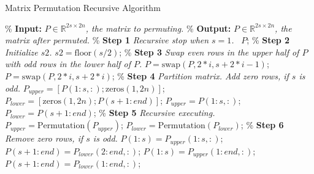 \documentclass[12pt]{article}
\begin{document}
\begin{algorithm}[htbp]
    \caption{Matrix Permutation Recursive Algorithm} \label{alg:Permutation}
    \begin{algorithmic}[1]
        \State \% \textbf{Input:} \textit{$P \in \mathbb{R}^{2s \times 2n}$, the matrix to permuting.}
        \State \% \textbf{Output:} \textit{$P \in \mathbb{R}^{2s \times 2n}$, the matrix after permuted.}
        \State
        \State \% \textbf{Step 1} \textit{Recursive stop when $s=1$.}
            \State \Return \ $P$;
        \End 
        \State
        \State \% \textbf{Step 2} \textit{Initialize $s2$.}
        \State $s2 = \text{floor}(s/2)$;
        \State
        \State \% \textbf{Step 3} \textit{Swap even rows in the upper half of $P$ with odd rows in the lower half of $P$.}
                \State $P= \text{swap}(P,2*i,s+2*i-1)$;
            \Else
                \State $P= \text{swap}(P,2*i,s+2*i)$;
            \End
        \End
        \State
        \State \% \textbf{Step 4} \textit{Partition matrix. Add zero rows, if $s$ is odd.}
            \State $P_{upper} = [P(1:s,:); \text{zeros}(1, 2n)]$;
            \State $P_{lower} = [\text{zeros}(1, 2n); P(s+1:end)]$;
        \Else
            \State $P_{upper} = P(1:s,:)$;
            \State $P_{lower} = P(s+1:end)$;
        \End
        \State
        \State \% \textbf{Step 5} \textit{Recursive executing.}
        \State $P_{upper} = \text{Permutation}(P_{upper})$;
        \State $P_{lower} = \text{Permutation}(P_{lower})$;
        \State
        \State \% \textbf{Step 6} \textit{Remove zero rows, if $s$ is odd.}
            \State $P(1:s) = P_{upper}(1:s, :)$;
            \State $P(s+1:end) = P_{lower}(2:end, :)$;
        \Else
            \State $P(1:s) = P_{upper}(1:end, :)$;
            \State $P(s+1:end) = P_{lower}(1:end, :)$;
        \End
    \End 
    \end{algorithmic}
\end{algorithm}
\end{document}
